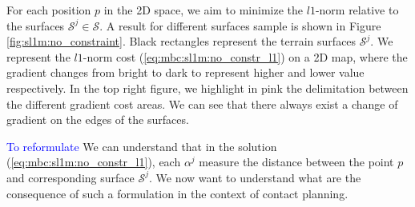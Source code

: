 For each position $p$ in the 2D space, we aim to minimize the $l1$-norm relative to the surfaces $\mathcal{S}^j \in \mathcal{S}$. 
A result for different surfaces sample is shown in Figure \ref{fig:sl1m:no_constraint}.
Black rectangles represent the terrain surfaces $\mathcal{S}^j$.
We represent the $l1$-norm cost (\ref{eq:mbc:sl1m:no_constr_l1}) on a 2D map, where the gradient changes from bright to dark to represent higher and lower value respectively.
In the top right figure, we highlight in pink the delimitation between the different gradient cost areas.
We can see that there always exist a change of gradient on the edges of the surfaces.

\textcolor{blue}{To reformulate}
We can understand that in the solution (\ref{eq:mbc:sl1m:no_constr_l1}), each $\alpha^j$ measure the distance between the point $p$ and corresponding surface $\mathcal{S}^j$.
We now want to understand what are the consequence of such a formulation in the context of contact planning.


